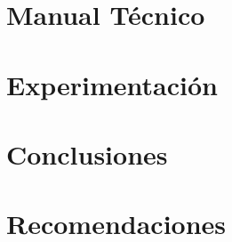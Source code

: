 \documentclass{article}
\begin{document}

\section{Manual Técnico}




\section{Experimentación}\label{sec:exp}




\section{Conclusiones}\label{sec:concl}



\section{Recomendaciones}\label{secrecomen}
\end{document}
